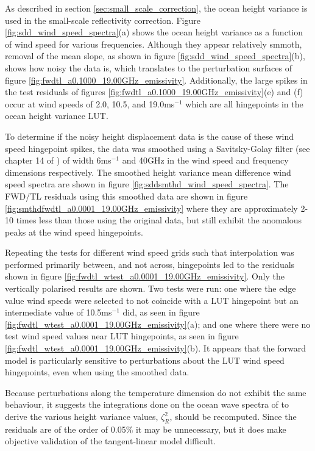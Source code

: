 As described in section \ref{sec:small_scale_correction}, the ocean height variance is used in the small-scale reflectivity correction. Figure \ref{fig:sdd_wind_speed_spectra}(a) shows the ocean height variance as a function of wind speed for various frequencies. Although they appear relatively smmoth, removal of the mean slope, as shown in figure \ref{fig:sdd_wind_speed_spectra}(b), shows how noisy the data is, which translates to the perturbation surfaces of figure \ref{fig:fwdtl_a0.1000_19.00GHz_emissivity}. Additionally, the large spikes in the test residuals of figures \ref{fig:fwdtl_a0.1000_19.00GHz_emissivity}(e) and (f) occur at wind speeds of 2.0, 10.5, and 19.0ms$^{-1}$ which are all hingepoints in the ocean height variance LUT.

To determine if the noisy height displacement data is the cause of these wind speed hingepoint spikes, the data was smoothed using a Savitsky-Golay filter (see chapter 14 of \cite{NumericalRecipes_Fortran}) of width 6ms$^{-1}$ and 40GHz in the wind speed and frequency dimensions respectively. The smoothed height variance mean difference wind speed spectra are shown in figure \ref{fig:sddsmthd_wind_speed_spectra}. The FWD/TL residuals using this smoothed data are shown in figure \ref{fig:smthdfwdtl_a0.0001_19.00GHz_emissivity} where they are approximately 2-10 times less than those using the original data, but still exhibit the anomalous peaks at the wind speed hingepoints.

Repeating the tests for different wind speed grids such that interpolation was performed primarily between, and not across, hingepoints led to the residuals shown in figure \ref{fig:fwdtl_wtest_a0.0001_19.00GHz_emissivity}. Only the vertically polarised results are shown. Two tests were run: one where the edge value wind speeds were selected to not coincide with a LUT hingepoint but an intermediate value of 10.5ms$^{-1}$ did, as seen in figure \ref{fig:fwdtl_wtest_a0.0001_19.00GHz_emissivity}(a); and one where there were no test wind speed values near LUT hingepoints, as seen in figure \ref{fig:fwdtl_wtest_a0.0001_19.00GHz_emissivity}(b). It appears that the forward model is particularly sensitive to perturbations about the LUT wind speed hingepoints, even when using the smoothed data.

Because perturbations along the temperature dimension do not exhibit the same behaviour, it suggests the integrations done on the ocean wave spectra of \cite{BjerkaasRiedel1979} to derive the various height variance values, $\zeta^2_R$, should be recomputed. Since the residuals are of the order of 0.05\% it may be unnecessary, but it does make objective validation of the tangent-linear model difficult.

